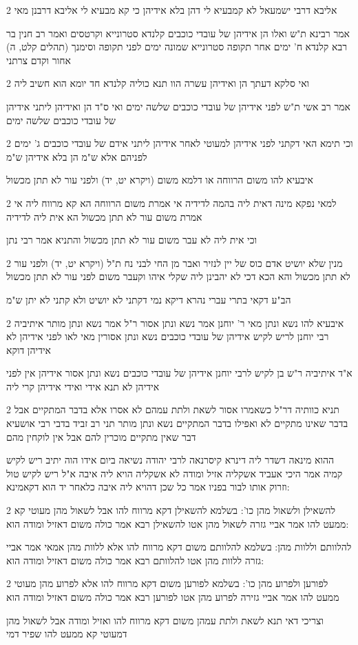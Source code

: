 \documentclass[12pt, openany]{book}
\newcommand{\sethebfont}{
\fontsize{10.5pt}{21.0pt} \selectfont
}
\newcommand{\twocol}[1]{
	{\sethebfont \begin{multicols}{2}
			#1
	\end{multicols}}	
}
\begin{document}
\twocol{אליבא דרבי ישמעאל לא קמבעיא לי דהן בלא אידיהן כי קא מבעיא לי אליבא דרבנן מאי
\par אמר רבינא ת"ש ואלו הן אידיהן של עובדי כוכבים קלנדא סטרונייא וקרטסים ואמר רב חנין בר רבא קלנדא ח' ימים אחר תקופה סטרונייא שמונה ימים לפני תקופה וסימנך (תהלים קלט, ה) אחור וקדם צרתני}
\twocol{ואי סלקא דעתך הן ואידיהן עשרה הוו תנא כוליה קלנדא חד יומא הוא חשיב ליה
\par אמר רב אשי ת"ש לפני אידיהן של עובדי כוכבים שלשה ימים ואי ס"ד הן ואידיהן ליתני אידיהן של עובדי כוכבים שלשה ימים}
\twocol{וכי תימא האי דקתני לפני אידיהן למעוטי לאחר אידיהן ליתני אידם של עובדי כוכבים ג' ימים לפניהם אלא ש"מ הן בלא אידיהן ש"מ
\par איבעיא להו משום הרווחה או דלמא משום (ויקרא יט, יד) ולפני עור לא תתן מכשול}
\twocol{למאי נפקא מינה דאית ליה בהמה לדידיה אי אמרת משום הרווחה הא קא מרווח ליה אי אמרת משום עור לא תתן מכשול הא אית ליה לדידיה
\par וכי אית ליה לא עבר משום עור לא תתן מכשול והתניא אמר רבי נתן}
\twocol{מנין שלא יושיט אדם כוס של יין לנזיר ואבר מן החי לבני נח ת"ל (ויקרא יט, יד) ולפני עור לא תתן מכשול והא הכא דכי לא יהבינן ליה שקלי איהו וקעבר משום לפני עור לא תתן מכשול
\par הב"ע דקאי בתרי עברי נהרא דיקא נמי דקתני לא יושיט ולא קתני לא יתן ש"מ}
\twocol{איבעיא להו נשא ונתן מאי ר' יוחנן אמר נשא ונתן אסור ר"ל אמר נשא ונתן מותר איתיביה רבי יוחנן לריש לקיש אידיהן של עובדי כוכבים נשא ונתן אסורין מאי לאו לפני אידיהן לא אידיהן דוקא
\par א"ד איתיביה ר"ש בן לקיש לרבי יוחנן אידיהן של עובדי כוכבים נשא ונתן אסור אידיהן אין לפני אידיהן לא תנא אידי ואידי אידיהן קרי ליה}
\twocol{תניא כוותיה דר"ל כשאמרו אסור לשאת ולתת עמהם לא אסרו אלא בדבר המתקיים אבל בדבר שאינו מתקיים לא ואפילו בדבר המתקיים נשא ונתן מותר תני רב זביד בדבי רבי אושעיא דבר שאין מתקיים מוכרין להם אבל אין לוקחין מהם
\par ההוא מינאה דשדר ליה דינרא קיסרנאה לרבי יהודה נשיאה ביום אידו הוה יתיב ריש לקיש קמיה אמר היכי אעביד אשקליה אזיל ומודה לא אשקליה הויא ליה איבה א"ל ריש לקיש טול וזרוק אותו לבור בפניו אמר כל שכן דהויא ליה איבה כלאחר יד הוא דקאמינא:}
\twocol{להשאילן ולשאול מהן כו': בשלמא להשאילן דקא מרווח להו אבל לשאול מהן מעוטי קא ממעט להו אמר אביי גזרה לשאול מהן אטו להשאילן רבא אמר כולה משום דאזיל ומודה הוא:
\par להלוותם וללוות מהן: בשלמא להלוותם משום דקא מרווח להו אלא ללוות מהן אמאי אמר אביי גזרה ללוות מהן אטו להלוותם רבא אמר כולה משום דאזיל ומודה הוא:}
\twocol{לפורען ולפרוע מהן כו': בשלמא לפורען משום דקא מרווח להו אלא לפרוע מהן מעוטי ממעט להו אמר אביי גזירה לפרוע מהן אטו לפורען רבא אמר כולה משום דאזיל ומודה הוא
\par וצריכי דאי תנא לשאת ולתת עמהן משום דקא מרווח להו ואזיל ומודה אבל לשאול מהן דמעוטי קא ממעט להו שפיר דמי}
\end{document}
